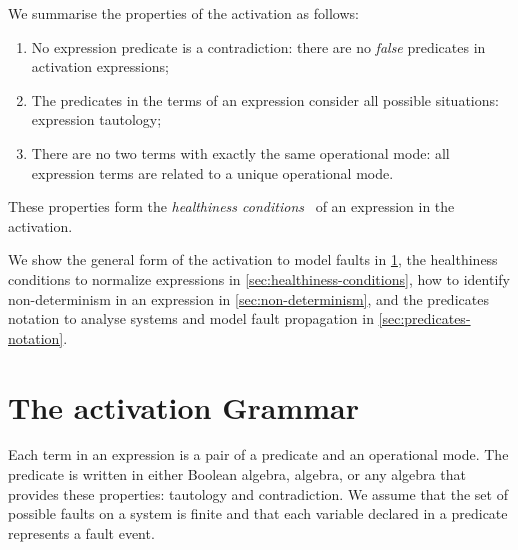 \documentclass[12pt,openright,twoside,a4paper,oldfontcommands,english,brazil,final]{abntex2}
\theoremstyle{theo}
\begin{document}


\begin{sloppypar}
We summarise the properties of the \ac{activation} as follows:
%
\begin{enumerate}
  \item No expression predicate is a contradiction: there are no \emph{false} predicates in activation expressions;
  \item The predicates in the terms of an expression consider all possible situations: expression tautology;
  \item There are no two terms with exactly the same operational mode: all expression terms are related to a unique operational mode.
\end{enumerate}
%
These properties form the \emph{healthiness conditions}~\cite{HH1998} of an expression in the \ac{activation}.
\end{sloppypar}

We show the general form of the \ac{activation} to model faults in \cref{sec:grammar}, the healthiness conditions to normalize expressions in \cref{sec:healthiness-conditions}, how to identify non-determinism in an expression in \cref{sec:non-determinism}, and the predicates notation to analyse systems and model fault propagation in \cref{sec:predicates-notation}.

\section{The \acl{activation} Grammar}
\label{sec:grammar}

Each term in an expression is a pair of a predicate and an operational mode.
The predicate is written in either Boolean algebra, \ac{algebra}, or any algebra that provides these properties: tautology and contradiction.
We assume that the set of possible faults on a system is finite and that each variable declared in a predicate represents a fault event.
\end{document}
